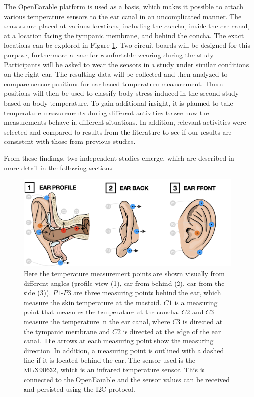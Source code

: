 The OpenEarable platform is used as a basis, which makes it possible to attach various temperature sensors to the ear canal in an uncomplicated manner. 
The sensors are placed at various locations, including the concha, inside the ear canal, at a location facing the tympanic membrane, and behind the concha.
The exact locations can be explored in Figure \ref{fig:ear_measurement_positions}.
Two circuit boards will be designed for this purpose, furthermore a case for comfortable wearing during the study.
Participants will be asked to wear the sensors in a study under similar conditions on the right ear.
The resulting data will be collected and then analyzed to compare sensor positions for ear-based temperature measurement. 
These positions will then be used to classify body stress induced in the second study based on body temperature.
To gain additional insight, it is planned to take temperature measurements during different activities to see how the measurements behave in different situations. 
In addition, relevant activities were selected and compared to results from the literature to see if our results are consistent with those from previous studies.

From these findings, two independent studies emerge, which are described in more detail in the following sections.

\begin{figure}
    \centering
    \includegraphics[scale=0.26]{thesis-doc/images/ear_measurement_points/emp.png}
    \caption{Here the temperature measurement points are shown visually from different angles (profile view (1), ear from behind (2), ear from the side (3)). $P1$-$P3$ are three measuring points behind the ear, which measure the skin temperature at the mastoid. $C1$ is a measuring point that measures the temperature at the concha. $C2$ and $C3$ measure the temperature in the ear canal, where $C3$ is directed at the tympanic membrane and $C2$ is directed at the edge of the ear canal. The arrows at each measuring point show the measuring direction. In addition, a measuring point is outlined with a dashed line if it is located behind the ear. The sensor used is the MLX90632, which is an infrared temperature sensor. This is connected to the OpenEarable and the sensor values can be received and persisted using the I2C protocol.}
    \label{fig:ear_measurement_positions}
\end{figure}


